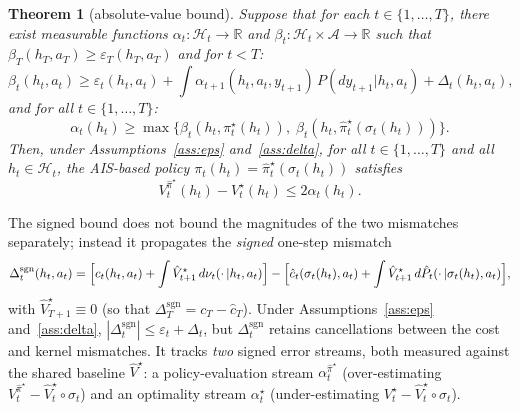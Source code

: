 \documentclass[10pt]{article}
\newtheorem{theorem}{Theorem}
\theoremstyle{definition}
\newcommand{\Dsgn}{\Delta^{\mathrm{sgn}}}
\begin{document}
\begin{theorem}[absolute-value bound]\label{thm:abs-pomdp}
Suppose that for each $t \in \{1, \dots, T\}$, there exist measurable
functions $\alpha_t : \mathcal{H}_t \to \mathbb{R}$ and
$\beta_t : \mathcal{H}_t \times \mathcal{A} \to \mathbb{R}$ such that
$\beta_T(h_T, a_T) \ge \varepsilon_T(h_T, a_T)$ and for $t < T$:
\begin{equation}
\beta_t(h_t, a_t) \ge \varepsilon_t(h_t, a_t)
+ \int \alpha_{t+1}(h_t, a_t, y_{t+1})\, P(dy_{t+1}|h_t, a_t)
+ \Delta_t(h_t, a_t),
\label{eq:abs-rec}
\end{equation}
and for all $t \in \{1, \dots, T\}$:
\begin{equation}
\alpha_t(h_t) \ge \max\bigl\{\beta_t(h_t, \pi^\star_t(h_t)),\;
\beta_t(h_t, \hat\pi^\star_t(\sigma_t(h_t)))\bigr\}.
\label{eq:abs-anchor}
\end{equation}
Then, under Assumptions~\ref{ass:eps} and~\ref{ass:delta}, for all
$t \in \{1, \dots, T\}$ and all $h_t \in \mathcal{H}_t$, the AIS-based
policy $\pi_t(h_t) = \hat\pi^\star_t(\sigma_t(h_t))$ satisfies
\[
V^{\hat\pi^\star}_t(h_t) - V^\star_t(h_t) \le 2\alpha_t(h_t).
\]
\end{theorem}

The signed bound does not bound the magnitudes of the two mismatches
separately; instead it propagates the \emph{signed} one-step mismatch
\begin{equation}
\Dsgn_t(h_t, a_t)
= \Bigl[c_t(h_t, a_t)
  + \int \hat V^\star_{t+1}\, d\nu_t(\cdot\,|h_t, a_t)\Bigr]
- \Bigl[\hat c_t(\sigma_t(h_t), a_t)
  + \int \hat V^\star_{t+1}\, d\hat P_t(\cdot\,|\sigma_t(h_t), a_t)\Bigr],
\label{eq:sgn-mismatch-pomdp}
\end{equation}
with $\hat V^\star_{T+1} \equiv 0$ (so that
$\Dsgn_T = c_T - \hat c_T$). Under Assumptions~\ref{ass:eps}
and~\ref{ass:delta}, $|\Dsgn_t| \le \varepsilon_t + \Delta_t$, but
$\Dsgn_t$ retains cancellations between the cost and kernel mismatches.
It tracks \emph{two} signed error streams, both measured against the
shared baseline $\hat V^\star$: a policy-evaluation stream
$\alpha^{\hat\pi^\star}_t$ (over-estimating
$V^{\hat\pi^\star}_t - \hat V^\star_t \circ \sigma_t$) and an
optimality stream $\alpha^\star_t$ (under-estimating
$V^\star_t - \hat V^\star_t \circ \sigma_t$).
\end{document}
